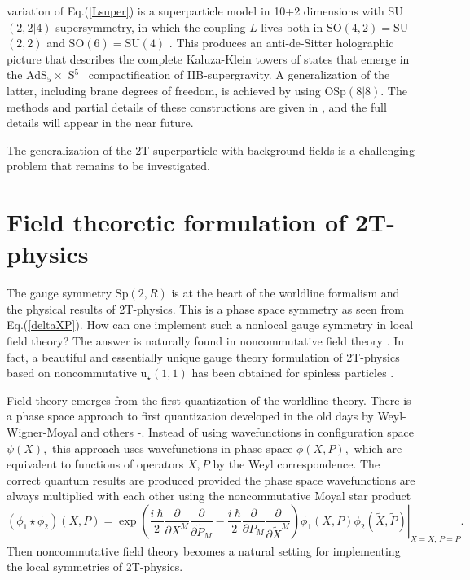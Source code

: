 \documentclass[a4paper,12pt]{article}
\begin{document}
variation of Eq.(\ref{Lsuper}) is a superparticle model in 10+2
dimensions with SU$\left( 2,2|4\right) $ supersymmetry, in which
the coupling $L$ lives both in SO$\left( 4,2\right) =$SU$\left(
2,2\right) $ and SO$\left( 6\right) =$SU$\left( 4\right) $
\cite{super2t}\cite{survey2T}. This produces an anti-de-Sitter
holographic picture that describes the complete Kaluza-Klein
towers of states that emerge in the AdS$_{5}\times $ S$^{5}$ \
compactification of IIB-supergravity. A generalization of the
latter, including brane degrees of freedom, is achieved by using
OSp$\left( 8|8\right) .$ The methods and partial details of these
constructions are given in \cite{super2t}\cite{survey2T}, and the
full details will appear in the near future.

The generalization of the 2T superparticle with background fields is a
challenging problem that remains to be investigated.

\section{Field theoretic formulation of 2T-physics}

The gauge symmetry Sp$\left( 2,R\right) $ is at the heart of the
worldline formalism and the physical results of 2T-physics. This
is a phase space symmetry as seen from Eq.(\ref{deltaXP}). How
can one implement such a nonlocal gauge symmetry in local field
theory? The answer is naturally found in noncommutative field
theory \cite{NCSp}. In fact, a beautiful and essentially unique
gauge theory formulation of 2T-physics based on noncommutative
u$_{\star }\left( 1,1\right) $ has been obtained  for spinless
particles \cite{NCu11}.

Field theory emerges from the first quantization of the worldline
theory. There is a phase space approach to first quantization
developed in the old days by Weyl-Wigner-Moyal and others
\cite{weyl}-\cite{moyal}. Instead of using wavefunctions in
configuration space $\psi \left( X\right) ,$ this approach uses
wavefunctions in phase space $\phi \left( X,P\right) ,$ which are
equivalent to functions of operators $X,P$ by the Weyl
correspondence. The correct quantum results are produced provided
the phase space wavefunctions are always multiplied with each
other using the noncommutative Moyal star product
\begin{equation}
\left( \phi _{1}\star \phi _{2}\right) \left( X,P\right) =\left.
\exp \left( \frac{i\ \hbar }{2}\frac{\partial }{\partial
X^{M}}\frac{\partial }{\partial \tilde{P}_{M}}-\frac{i\
\hbar}{2}\frac{\partial }{\partial P_{M}}\frac{
\partial }{\partial \tilde{X}^{M}}\right) \phi _{1}\left( X,P\right) \phi
_{2}\left( \tilde{X},\tilde{P}\right) \right| _{X=\tilde{X},\,P=\tilde{P}}.
\end{equation}
Then noncommutative field theory becomes a natural setting for
implementing the local symmetries of 2T-physics.
\end{document}
